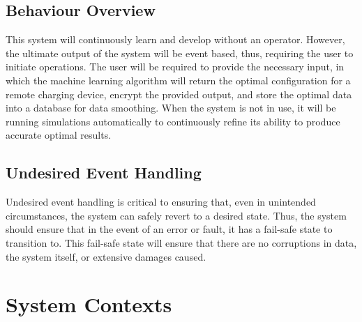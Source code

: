 \documentclass[12pt, titlepage]{article}
\begin{document}
\subsection{Behaviour Overview}
This system will continuously learn and develop without an operator. However, the ultimate output of the system will be event based, thus, requiring the user to initiate operations. The user will be required to provide the necessary input, in which the machine learning algorithm will return the optimal configuration for a remote charging device, encrypt the provided output, and store the optimal data into a database for data smoothing. When the system is not in use, it will be running simulations automatically to continuously refine its ability to produce accurate optimal results.

\subsection{Undesired Event Handling}
Undesired event handling is critical to ensuring that, even in unintended circumstances, the system can safely revert to a desired state. Thus, the system should ensure that in the event of an error or fault, it has a fail-safe state to transition to. This fail-safe state will ensure that there are no corruptions in data, the system itself, or extensive damages caused.



\section{System Contexts}
\end{document}
